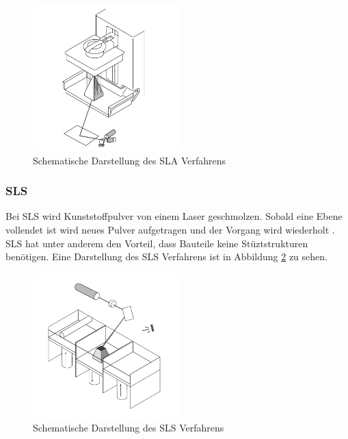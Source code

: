 \begin{figure}[H]
    \centering
    \includegraphics[width=0.5\textwidth]{images/sla.png}
    \caption{Schematische Darstellung des \ac{SLA} Verfahrens }
    \label{fig:sla}
\end{figure}

\subsubsection{\ac{SLS}}

Bei \ac{SLS} wird Kunststoffpulver von einem Laser geschmolzen. Sobald eine Ebene vollendet ist wird neues Pulver aufgetragen und der Vorgang wird wiederholt . \ac{SLS} hat unter anderem den Vorteil, dass Bauteile keine Stüztstrukturen benötigen. Eine Darstellung des \ac{SLS} Verfahrens ist in Abbildung \ref{fig:sls} zu sehen.

\begin{figure}[H]
    \centering
    \includegraphics[width=0.5\textwidth]{images/sls.png}
    \caption{Schematische Darstellung des \ac{SLS} Verfahrens }
    \label{fig:sls}
\end{figure}